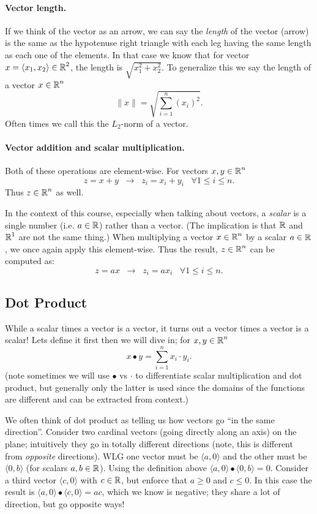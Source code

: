 \documentclass[11pt, oneside]{article}   	%
\begin{document}
\paragraph{Vector length.}
If we think of the vector as an arrow, we can say the \emph{length} of the vector (arrow) is the same as the hypotenuse 
right triangle with each leg having the same length as each one of the elements. 
In that case we know that for vector $x = \left\langle x_1,x_2\right\rangle\in\operatorname{\mathbb{R}}^2$, the length is $\sqrt{x_1^2 + x_2^2}$.
To generalize this we say the length of a vector $x\in\operatorname{\mathbb{R}}^n$
\[
\|x\| = \sqrt{\sum_{i=1}^n \left(x_i\right)^2}.
\]
Often times we call this the $L_2$-norm of a vector. 

\paragraph{Vector addition and scalar multiplication.}
Both of these operations are element-wise. 
For vectors $x,y \in \operatorname{\mathbb{R}}^n$
\[
z = x+y \;\;\rightarrow \;\; z_i = x_i + y_i \;\;\; \forall 1 \le i \le n.
\]
Thus $z \in \operatorname{\mathbb{R}}^n$ as well. 

In the context of this course, especially when talking about vectors, a \emph{scalar} is a single number (i.e. $a \in \operatorname{\mathbb{R}}$) rather than a vector. 
(The implication is that $\operatorname{\mathbb{R}}$ and $\operatorname{\mathbb{R}}^1$ are not the same thing.)
When multiplying a vector $x\in \operatorname{\mathbb{R}}^n$ by a scalar $a\in\operatorname{\mathbb{R}}$, we once again apply this element-wise. 
Thus the result, $z\in\operatorname{\mathbb{R}}^n$ can be computed as:
\[
z = ax \;\; \rightarrow \;\; z_i = a x_i \;\;\; \forall 1 \le i \le n.
\]


\subsection{Dot Product}
While a scalar times a vector is a vector, it turns out a vector times a vector is a scalar! 
Lets define it first then we will dive in;
for $x,y \in \operatorname{\mathbb{R}}^n$
\[
x \bullet y = \sum_{i=1}^n x_i \cdot y_i.
\]
(note sometimes we will use $\bullet$ vs $\cdot$ to differentiate scalar multiplication and dot product, but generally only the latter is used since the domains of the functions are different and can be extracted from context.)

We often think of dot product as telling us how vectors go ``in the same direction''. 
Consider two cardinal vectors (going directly along an axis) on the plane;
intuitively they go in totally different directions (note, this is different from \textit{opposite} directions). 
WLG one vector must be $\langle a, 0 \rangle$ and the other must be  $\langle 0,b \rangle$ (for scalars $a,b\in\operatorname{\mathbb{R}}$). 
Using the definition above $\langle a, 0 \rangle \bullet \langle 0,b \rangle = 0$.
Consider a third vector $\langle c, 0 \rangle$ with $c\in\operatorname{\mathbb{R}}$, but enforce that $a \ge 0$ and $c \le 0$. 
In this case the result is $\langle a, 0 \rangle \bullet \langle c,0 \rangle = ac$, which we know is negative; 
they share a lot of direction, but go opposite ways! 
\end{document}
